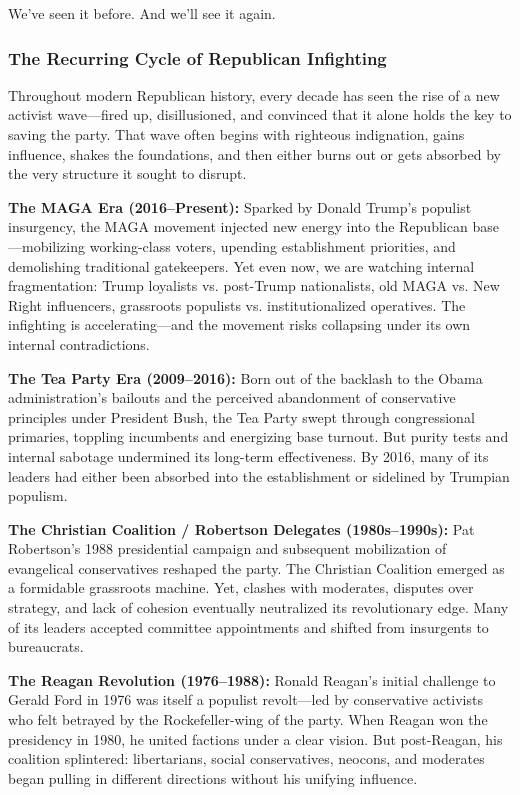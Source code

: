 We’ve seen it before. And we’ll see it again.

\subsubsection{The Recurring Cycle of Republican Infighting}
Throughout modern Republican history, every decade has seen the rise of a new activist wave—fired up, disillusioned, and convinced that it alone holds the key to saving the party. That wave often begins with righteous indignation, gains influence, shakes the foundations, and then either burns out or gets absorbed by the very structure it sought to disrupt.

\textbf{The MAGA Era (2016–Present):} Sparked by Donald Trump’s populist insurgency, the MAGA movement injected new energy into the Republican base—mobilizing working-class voters, upending establishment priorities, and demolishing traditional gatekeepers. Yet even now, we are watching internal fragmentation: Trump loyalists vs. post-Trump nationalists, old MAGA vs. New Right influencers, grassroots populists vs. institutionalized operatives. The infighting is accelerating—and the movement risks collapsing under its own internal contradictions.

\textbf{The Tea Party Era (2009–2016):} Born out of the backlash to the Obama administration’s bailouts and the perceived abandonment of conservative principles under President Bush, the Tea Party swept through congressional primaries, toppling incumbents and energizing base turnout. But purity tests and internal sabotage undermined its long-term effectiveness. By 2016, many of its leaders had either been absorbed into the establishment or sidelined by Trumpian populism.

\textbf{The Christian Coalition / Robertson Delegates (1980s–1990s):} Pat Robertson’s 1988 presidential campaign and subsequent mobilization of evangelical conservatives reshaped the party. The Christian Coalition emerged as a formidable grassroots machine. Yet, clashes with moderates, disputes over strategy, and lack of cohesion eventually neutralized its revolutionary edge. Many of its leaders accepted committee appointments and shifted from insurgents to bureaucrats.

\textbf{The Reagan Revolution (1976–1988):} Ronald Reagan’s initial challenge to Gerald Ford in 1976 was itself a populist revolt—led by conservative activists who felt betrayed by the Rockefeller-wing of the party. When Reagan won the presidency in 1980, he united factions under a clear vision. But post-Reagan, his coalition splintered: libertarians, social conservatives, neocons, and moderates began pulling in different directions without his unifying influence.

